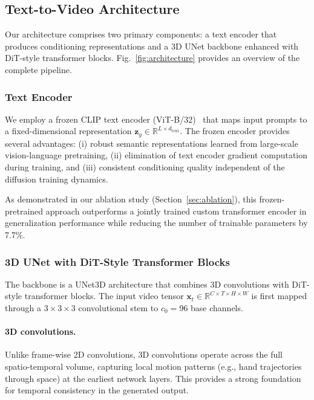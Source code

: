 \documentclass{ieeeaccess}
\begin{document}
\subsection{Text-to-Video Architecture}
\label{subsec:architecture}

Our architecture comprises two primary components: a text encoder that produces conditioning representations and a 3D UNet backbone enhanced with DiT-style transformer blocks. Fig.~\ref{fig:architecture} provides an overview of the complete pipeline.

\subsubsection{Text Encoder}

We employ a frozen CLIP text encoder (ViT-B/32)~\cite{radford2021clip} that maps input prompts to a fixed-dimensional representation $\mathbf{z}_y \in \mathbb{R}^{L \times d_\mathrm{text}}$. The frozen encoder provides several advantages: (i) robust semantic representations learned from large-scale vision-language pretraining, (ii) elimination of text encoder gradient computation during training, and (iii) consistent conditioning quality independent of the diffusion training dynamics.

As demonstrated in our ablation study (Section~\ref{sec:ablation}), this frozen-pretrained approach outperforms a jointly trained custom transformer encoder in generalization performance while reducing the number of trainable parameters by 7.7\%.

\subsubsection{3D UNet with DiT-Style Transformer Blocks}

The backbone is a UNet3D architecture that combines 3D convolutions with DiT-style transformer blocks. The input video tensor $\mathbf{x}_t \in \mathbb{R}^{C \times T \times H \times W}$ is first mapped through a $3 \times 3 \times 3$ convolutional stem to $c_0 = 96$ base channels.

\paragraph{3D convolutions.} Unlike frame-wise 2D convolutions, 3D convolutions operate across the full spatio-temporal volume, capturing local motion patterns (e.g., hand trajectories through space) at the earliest network layers. This provides a strong foundation for temporal consistency in the generated output.
\end{document}
